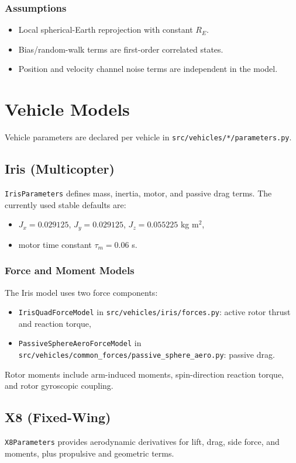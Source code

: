 \documentclass[11pt,a4paper]{article}
\begin{document}
\subsubsection*{Assumptions}
\begin{itemize}
    \item Local spherical-Earth reprojection with constant $R_E$.
    \item Bias/random-walk terms are first-order correlated states.
    \item Position and velocity channel noise terms are independent in the model.
\end{itemize}

\section{Vehicle Models}
Vehicle parameters are declared per vehicle in \texttt{src/vehicles/*/parameters.py}.

\subsection{Iris (Multicopter)}
\texttt{IrisParameters} defines mass, inertia, motor, and passive drag terms. The currently used stable defaults are:
\begin{itemize}
    \item $J_x=0.029125$, $J_y=0.029125$, $J_z=0.055225$ kg m$^2$,
    \item motor time constant $\tau_m=0.06$ s.
\end{itemize}

\subsubsection*{Force and Moment Models}
The Iris model uses two force components:
\begin{itemize}
    \item \texttt{IrisQuadForceModel} in \texttt{src/vehicles/iris/forces.py}: active rotor thrust and reaction torque,
    \item \texttt{PassiveSphereAeroForceModel} in \texttt{src/vehicles/common\_forces/passive\_sphere\_aero.py}: passive drag.
\end{itemize}
Rotor moments include arm-induced moments, spin-direction reaction torque, and rotor gyroscopic coupling.

\subsection{X8 (Fixed-Wing)}
\texttt{X8Parameters} provides aerodynamic derivatives for lift, drag, side force, and moments, plus propulsive and geometric terms.
\end{document}
